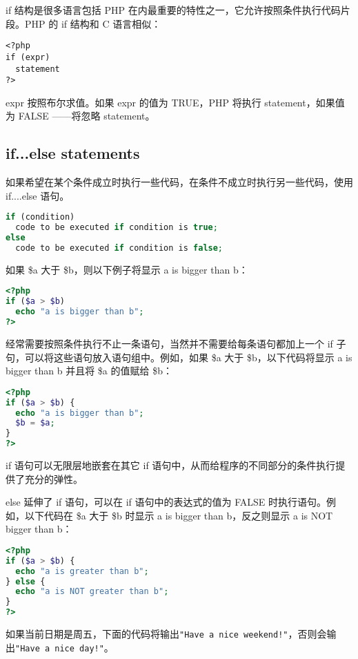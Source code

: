if 结构是很多语言包括 PHP 在内最重要的特性之一，它允许按照条件执行代码片段。PHP 的 if 结构和 C 语言相似：

\begin{verbatim}
<?php
if (expr)
  statement
?>
\end{verbatim}

expr 按照布尔求值。如果 expr 的值为 TRUE，PHP 将执行 statement，如果值为 FALSE ——将忽略 statement。



\subsection{if...else statements}

如果希望在某个条件成立时执行一些代码，在条件不成立时执行另一些代码，使用 if....else 语句。

\begin{lstlisting}[language=PHP]
if (condition)
  code to be executed if condition is true;
else
  code to be executed if condition is false; 
\end{lstlisting}


如果 \$a 大于 \$b，则以下例子将显示 a is bigger than b：

\begin{lstlisting}[language=PHP]
<?php
if ($a > $b)
  echo "a is bigger than b";
?>
\end{lstlisting}

经常需要按照条件执行不止一条语句，当然并不需要给每条语句都加上一个 if 子句，可以将这些语句放入语句组中。例如，如果 \$a 大于 \$b，以下代码将显示 a is bigger than b 并且将 \$a 的值赋给 \$b：

\begin{lstlisting}[language=PHP]
<?php
if ($a > $b) {
  echo "a is bigger than b";
  $b = $a;
}
?>
\end{lstlisting}

if 语句可以无限层地嵌套在其它 if 语句中，从而给程序的不同部分的条件执行提供了充分的弹性。

else 延伸了 if 语句，可以在 if 语句中的表达式的值为 FALSE 时执行语句。例如，以下代码在 \$a 大于 \$b 时显示 a is bigger than b，反之则显示 a is NOT bigger than b：


\begin{lstlisting}[language=PHP]
<?php
if ($a > $b) {
  echo "a is greater than b";
} else {
  echo "a is NOT greater than b";
}
?>
\end{lstlisting}

如果当前日期是周五，下面的代码将输出\texttt{"Have a nice weekend!"}，否则会输出\texttt{"Have a nice day!"}。


